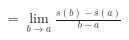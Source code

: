 \documentclass[preview]{standalone}
\begin{document}
\begin{align*}
= \lim_{b \to a} \frac{s(b) - s(a)}{b-a}
\end{align*}
\end{document}
